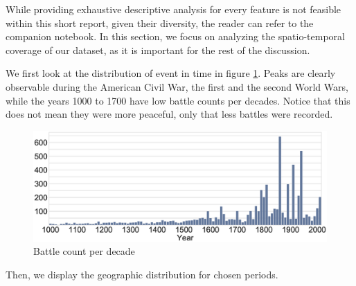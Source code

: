 While providing exhaustive descriptive analysis for every feature is not feasible within this short report, given their diversity, the reader can refer to the companion notebook. In this section, we focus on analyzing the spatio-temporal coverage of our dataset, as it is important for the rest of the discussion.

We first look at the distribution of event in time in figure \ref{fig:temporal_coverage}. Peaks are clearly observable during the American Civil War, the first and the second World Wars,  while the years 1000 to 1700 have low battle counts per decades. Notice that this does not mean they were more peaceful, only that less battles were recorded.

\begin{figure}[!h]
	\centering
	\includegraphics[width=\linewidth]{figures/temporal_coverage.eps}
	\caption{Battle count per decade}
	\label{fig:temporal_coverage}
\end{figure}

Then, we display the geographic distribution for chosen periods.

